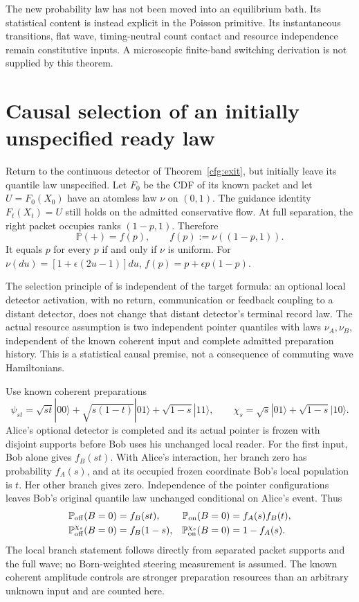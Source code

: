 \documentclass[11pt,oneside,openany]{book}
\theoremstyle{definition}
\theoremstyle{remark}\newtheorem{remark}[theorem]{Remark}
\begin{document}
The new probability law has not been moved into an equilibrium bath.
Its statistical content is instead explicit in the Poisson primitive.
Its instantaneous transitions, flat wave, timing-neutral count contact and
resource independence remain constitutive inputs. A microscopic finite-band
switching derivation is not supplied by this theorem.

\section{Causal selection of an initially unspecified ready law}

Return to the continuous detector of Theorem~\ref{cfg:exit}, but initially
leave its quantile law unspecified. Let $F_0$ be the CDF of its known packet
and let $U=F_0(X_0)$ have an atomless law $\nu$ on $(0,1)$.
The guidance identity $F_t(X_t)=U$ still holds on the admitted conservative
flow. At full separation, the right packet occupies ranks $(1-p,1)$.
Therefore
\begin{equation}
 \mathbb P(+)=f(p),\qquad f(p):=\nu((1-p,1)).
 \label{prep:response}
\end{equation}
It equals $p$ for every $p$ if and only if $\nu$ is uniform.
For $\nu(du)=[1+\epsilon(2u-1)]du$,
$f(p)=p+\epsilon p(1-p)$.

The selection principle of \cite{M20} is independent of the target formula:
an optional local detector activation, with no return, communication or
feedback coupling to a distant detector, does not change that distant
detector's terminal record law. The actual resource assumption is two
independent pointer quantiles with laws $\nu_A,\nu_B$, independent of
the known coherent input and complete admitted preparation history.
This is a statistical causal premise, not a consequence of commuting wave
Hamiltonians.

Use known coherent preparations
\[
 \psi_{st}=\sqrt{st}|00\rangle+\sqrt{s(1-t)}|01\rangle
                         +\sqrt{1-s}|11\rangle,\qquad
 \chi_s=\sqrt s|01\rangle+\sqrt{1-s}|10\rangle.
\]
Alice's optional detector is completed and its actual pointer is frozen
with disjoint supports before Bob uses his unchanged local reader.
For the first input, Bob alone gives $f_B(st)$. With Alice's interaction,
her branch zero has probability $f_A(s)$, and at its occupied frozen
coordinate Bob's local population is $t$. Her other branch gives zero.
Independence of the pointer configurations leaves Bob's original quantile
law unchanged conditional on Alice's event. Thus
\begin{align}
 \mathbb P_{\rm off}(B=0)&=f_B(st),&
 \mathbb P_{\rm on}(B=0)&=f_A(s)f_B(t),\\
 \mathbb P_{\rm off}^{\chi_s}(B=0)&=f_B(1-s),&
 \mathbb P_{\rm on}^{\chi_s}(B=0)&=1-f_A(s).
 \label{prep:causaltests}
\end{align}
The local branch statement follows directly from separated packet supports
and the full wave; no Born-weighted steering measurement is assumed.
The known coherent amplitude controls are stronger preparation resources
than an arbitrary unknown input and are counted here.
\end{document}
